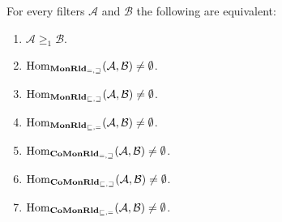 \begin{thm}
For every filters $\mathcal{A}$ and $\mathcal{B}$ the following
are equivalent:
\begin{enumerate}
\item \label{ge1-ineq}$\mathcal{A}\ge_{1}\mathcal{B}$.
\item \label{ge1-eq-ge}$\operatorname{Hom}_{\mathbf{MonRld}_{=,\sqsupseteq}}(\mathcal{A},\mathcal{B})\ne\emptyset$.
\item \label{ge1-le-ge}$\operatorname{Hom}_{\mathbf{MonRld}_{\sqsubseteq,\sqsupseteq}}(\mathcal{A},\mathcal{B})\ne\emptyset$.
\item \label{ge1-le-eq}$\operatorname{Hom}_{\mathbf{MonRld}_{\sqsubseteq,=}}(\mathcal{A},\mathcal{B})\ne\emptyset$.
\item \label{g1-c-eq-ge}$\operatorname{Hom}_{\mathbf{CoMonRld}_{=,\sqsupseteq}}(\mathcal{A},\mathcal{B})\ne\emptyset$.
\item \label{g1-c-le-ge}$\operatorname{Hom}_{\mathbf{CoMonRld}_{\sqsubseteq,\sqsupseteq}}(\mathcal{A},\mathcal{B})\ne\emptyset$.
\item \label{g1-c-le-eq}$\operatorname{Hom}_{\mathbf{CoMonRld}_{\sqsubseteq,=}}(\mathcal{A},\mathcal{B})\ne\emptyset$.
\end{enumerate}
\end{thm}
